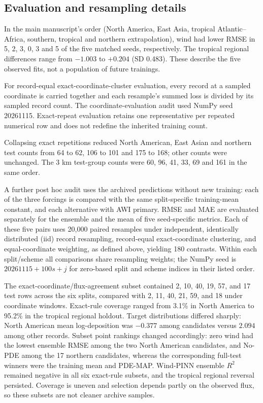 \documentclass[11pt,a4paper]{article}
\begin{document}
\subsection*{Evaluation and resampling details}
In the main manuscript's order (North America, East Asia, tropical Atlantic--Africa, southern, tropical and northern extrapolation), wind had lower RMSE in 5, 2, 3, 0, 3 and 5 of the five matched seeds, respectively. The tropical regional differences range from $-1.003$ to $+0.204$ (SD 0.483). These describe the five observed fits, not a population of future trainings.

For record-equal exact-coordinate-cluster evaluation, every record at a sampled coordinate is carried together and each resample's summed loss is divided by its sampled record count. The coordinate-evaluation audit used NumPy seed 20261115. Exact-repeat evaluation retains one representative per repeated numerical row and does not redefine the inherited training count.

Collapsing exact repetitions reduced North American, East Asian and northern test counts from 64 to 62, 106 to 101 and 175 to 168; other counts were unchanged. The 3 km test-group counts were 60, 96, 41, 33, 69 and 161 in the same order.

A further post hoc audit uses the archived predictions without new training: each of the three forcings is compared with the same split-specific training-mean constant, and each alternative with AWI primary. RMSE and MAE are evaluated separately for the ensemble and the mean of five seed-specific metrics. Each of these five pairs uses 20,000 paired resamples under independent, identically distributed (iid) record resampling, record-equal exact-coordinate clustering, and equal-coordinate weighting, as defined above, yielding 180 contrasts. Within each split/scheme all comparisons share resampling weights; the NumPy seed is $20261115+100s+j$ for zero-based split and scheme indices in their listed order.

The exact-coordinate/flux-agreement subset contained 2, 10, 40, 19, 57, and 17 test rows across the six splits, compared with 2, 11, 40, 21, 59, and 18 under coordinate windows. Exact-rule coverage ranged from 3.1\% in North America to 95.2\% in the tropical regional holdout. Target distributions differed sharply: North American mean log-deposition was $-0.377$ among candidates versus $2.094$ among other records. Subset point rankings changed accordingly: zero wind had the lowest ensemble RMSE among the two North American candidates, and No-PDE among the 17 northern candidates, whereas the corresponding full-test winners were the training mean and PDE-MAP. Wind-PINN ensemble $R^2$ remained negative in all six exact-rule subsets, and the tropical regional reversal persisted. Coverage is uneven and selection depends partly on the observed flux, so these subsets are not cleaner archive samples.
\end{document}
